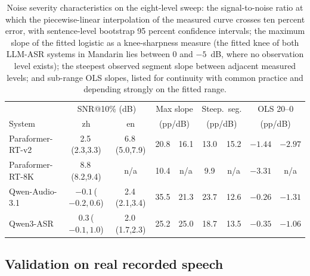 \begin{table}[t]
\centering
\caption{Noise severity characteristics on the eight-level sweep: the
signal-to-noise ratio at which the piecewise-linear interpolation of the
measured curve crosses ten percent error, with sentence-level bootstrap 95
percent confidence intervals; the maximum slope of the fitted logistic as
a knee-sharpness measure (the fitted knee of both LLM-ASR systems in
Mandarin lies between 0 and $-5$~dB, where no observation level exists);
the steepest observed segment slope between adjacent measured levels; and
sub-range OLS slopes, listed for continuity with common practice and
depending strongly on the fitted range.}
\label{tab:slopes}
\footnotesize
\setlength{\tabcolsep}{1.5pt}
\begin{tabular}{lcccccccc}
\toprule
 & \multicolumn{2}{c}{SNR@10\% (dB)} & \multicolumn{2}{c}{Max slope} & \multicolumn{2}{c}{Steep.\ seg.} & \multicolumn{2}{c}{OLS 20--0} \\
System & zh & en & \multicolumn{2}{c}{(pp/dB)} & \multicolumn{2}{c}{(pp/dB)} & \multicolumn{2}{c}{(pp/dB)} \\
\midrule
Paraformer-RT-v2 & 2.5\,(2.3,3.3) & 6.8\,(5.0,7.9) & 20.8 & 16.1 & 13.0 & 15.2 & $-1.44$ & $-2.97$ \\
Paraformer-RT-8K & 8.8\,(8.2,9.4) & n/a & 10.4 & n/a & 9.9 & n/a & $-3.31$ & n/a \\
Qwen-Audio-3.1 & $-0.1$\,($-0.2,0.6$) & 2.4\,(2.1,3.4) & 35.5 & 21.3 & 23.7 & 12.6 & $-0.26$ & $-1.31$ \\
Qwen3-ASR & 0.3\,($-0.1,1.0$) & 2.0\,(1.7,2.3) & 25.2 & 25.0 & 18.7 & 13.5 & $-0.35$ & $-1.06$ \\
\bottomrule
\end{tabular}
\end{table}

\subsection{Validation on real recorded speech}
\label{sec:results:real}

